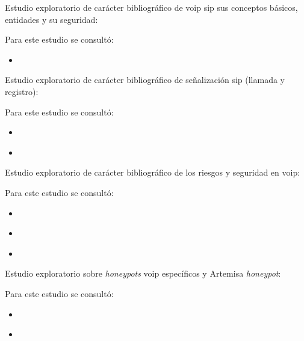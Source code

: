 \documentclass[a4paper,12pt]{report}
\begin{document}
\begin{enumerate}

{\bf \item Estudio exploratorio de carácter bibliográfico de \ac{voip} \ac{sip} sus conceptos básicos, entidades y
su seguridad:}

Para este estudio se consultó:

\begin{itemize}
 
  \item \cite{nassarm}

\end{itemize}

{\bf \item Estudio exploratorio de carácter bibliográfico de señalización \ac{sip} (llamada y registro):}

Para este estudio se consultó:

\begin{itemize}

  \item \cite{johnrfc3665}

  \item \cite{weichen}

\end{itemize}

{\bf \item Estudio exploratorio de carácter bibliográfico de los riesgos y
seguridad en \ac{voip}:}

Para este estudio se consultó:

\begin{itemize}

  \item \cite{johnrfc3665}
  
  \item \cite{nassarm} 

  \item \cite {wheeler}

\end{itemize}

{\bf \item Estudio exploratorio sobre \emph{honeypots} \ac{voip} específicos y Artemisa \emph{honeypot}:}

Para este estudio se consultó:

\begin{itemize}

  \item \cite{acunetix}  

  \item \cite{digium}


\end{itemize}
\end{enumerate}
\end{document}
